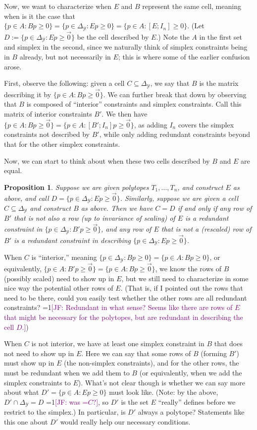 \documentclass[12pt]{article}
\newcommand{\Comments}{1}
\newcommand{\mynote}[2]{\ifnum\Comments=1\textcolor{#1}{#2}\fi}
\newcommand{\jessie}[1]{\mynote{purple}{[JF: #1]}}
\newcommand{\simplex}{\Delta_\Y}
\newcommand{\Y}{\mathcal{Y}}
\newtheorem{proposition}{Proposition}
\begin{document}
  Now, we want to characterize when $E$ and $B$ represent the same cell, meaning when is it the case that $\{p \in A : B p \geq 0\} = \{p \in \simplex : E p \geq 0\} = \{p \in A : [E; I_n] \geq 0\}$.
  (Let $D := \{p \in \simplex : Ep \geq \vec 0\}$ be the cell described by $E$.)  
  Note the $A$ in the first set and simplex in the second, since we naturally think of simplex constraints being in $B$ already, but not necessarily in $E$; this is where some of the earlier confusion arose.
  
  First, observe the following: given a cell $C \subseteq \simplex$, we say that $B$ is the matrix describing it by $\{p \in A : Bp \geq \vec 0\}$.  
  We can further break that down by observing that $B$ is composed of ``interior'' constraints and simplex constraints.
  Call this matrix of interior constraints $B'$.
  We then have $\{p \in A: Bp \geq \vec 0\} = \{p \in A : [B' ; I_n] p \geq \vec 0\}$, as adding $I_n$ covers the simplex constraints not described by $B'$, while only adding redundant constraints beyond that for the other simplex constraints.
  
  Now, we can start to think about when these two cells described by $B$ and $E$ are equal.
  
  \begin{proposition}
  	Suppose we are given polytopes $T_1, \ldots, T_n$, and construct $E$ as above, and call $D = \{p \in \simplex : Ep \geq \vec 0\}$.
  	Similarly, suppose we are given a cell $C \subseteq \simplex$ and construct $B$ as above.
  	Then we have $C=D$ if and only if any row of $B'$ that is not also a row (up to invariance of scaling) of $E$ is a redundant constraint in $\{p \in \simplex: B'p \geq \vec 0\}$, and any row of $E$ that is not a (rescaled) row of $B'$ is a redundant constraint in describing $\{p \in \simplex: Ep \geq \vec 0\}$.
  \end{proposition}
  
  When $C$ is ``interior,'' meaning $\{p \in \simplex : Bp \geq 0\} = \{p \in A : Bp \geq 0\}$, or equivalently, $\{p \in A : B'p \geq \vec 0\} = \{p \in A : B p \geq \vec 0\}$, we know the rows of $B$ (possibly scaled) need to show up in $E$, but we still need to characterize in some nice way the potential other rows of $E$.  
  (That is, if I pointed out the rows that need to be there, could you easily test whether the other rows are all redundant constraints? \jessie{Redundant in what sense?  Seems like there are rows of $E$ that might be necessary for the polytopes, but are redundant in describing the cell $D$.})

  When $C$ is not interior, we have at least one simplex constraint in $B$ that does not need to show up in $E$.  
  Here we can say that some rows of $B$ (forming $B'$) must show up in $E$ (the non-simplex constraints), and for the other rows, the must be redundant when we add them to $B$ (or equivalently, when we add the simplex constraints to $E$).  
  What's not clear though is whether we can say more about what $D' = \{p \in A : E p \geq 0\}$ must look like.  
  (Note: by the above, $D' \cap \simplex = D$ \jessie{was =$C$?}, so $D'$ is the set $E$ ``really'' defines before we restrict to the simplex.)  
  In particular, is $D'$ always a polytope?  
  Statements like this one about $D'$ would really help our necessary conditions.
\end{document}
